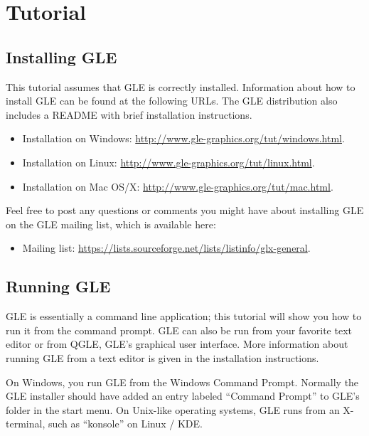 \def\tb{\hspace*{0.0cm}\sf}
\chapter{Tutorial}
\label{tut:chap}

\section{Installing GLE}

This tutorial assumes that GLE is correctly installed. Information about how to install GLE can be found at the following URLs. The GLE distribution also includes a README with brief installation instructions.

\begin{itemize}
\item Installation on Windows: \url{http://www.gle-graphics.org/tut/windows.html}.

\item Installation on Linux: \url{http://www.gle-graphics.org/tut/linux.html}.

\item Installation on Mac OS/X: \url{http://www.gle-graphics.org/tut/mac.html}.
\end{itemize}

Feel free to post any questions or comments you might have about installing GLE on the GLE mailing list, which is available here:

\begin{itemize}
\item Mailing list: \url{https://lists.sourceforge.net/lists/listinfo/glx-general}.
\end{itemize}

\section{Running GLE}

GLE is essentially a command line application; this tutorial will show you how to run it from the command prompt. GLE can also be run from your favorite text editor or from QGLE, GLE's graphical user interface. More information about running GLE from a text editor is given in the installation instructions.

On Windows, you run GLE from the Windows Command Prompt. Normally the GLE installer should have added an entry labeled ``Command Prompt'' to GLE's folder in the start menu. On Unix-like operating systems, GLE runs from an X-terminal, such as ``konsole'' on Linux / KDE.

